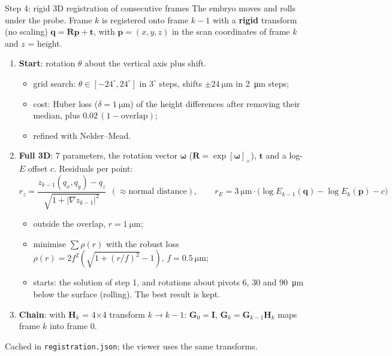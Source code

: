 \documentclass[aspectratio=169,9pt]{beamer}
\begin{document}
\begin{frame}{Step 4: rigid 3D registration of consecutive frames}
\small
The embryo moves and rolls under the probe. Frame $k$ is registered onto frame $k-1$ with a \textbf{rigid} transform (no scaling) $\mathbf q=\mathbf R\mathbf p+\mathbf t$, with $\mathbf p=(x,y,z)$ in the scan coordinates of frame $k$ and $z$ = height.
\begin{enumerate}
\item \textbf{Start}: rotation $\theta$ about the vertical axis plus shift.
 \begin{itemize}
 \item grid search: $\theta\in[-24^\circ,24^\circ]$ in $3^\circ$ steps, shifts $\pm\SI{24}{\micro\metre}$ in \SI{2}{\micro\metre} steps;
 \item cost: Huber loss ($\delta=\SI{1}{\micro\metre}$) of the height differences after removing their median, plus $0.02\,(1-\text{overlap})$;
 \item refined with Nelder--Mead.
 \end{itemize}
\item \textbf{Full 3D}: 7 parameters, the rotation vector $\bm\omega$ ($\mathbf R=\exp[\bm\omega]_\times$), $\mathbf t$ and a log-$E$ offset $c$. Residuals per point:
\[r_z=\frac{z_{k-1}(q_x,q_y)-q_z}{\sqrt{1+|\nabla z_{k-1}|^2}}\ \ (\approx\text{normal distance}),\qquad r_E=\SI{3}{\micro\metre}\cdot\bigl(\log E_{k-1}(\mathbf q)-\log E_k(\mathbf p)-c\bigr)\]
 \begin{itemize}
 \item outside the overlap, $r=\SI{1}{\micro\metre}$;
 \item minimise $\sum\rho(r)$ with the robust loss $\rho(r)=2f^2(\sqrt{1+(r/f)^2}-1)$, $f=\SI{0.5}{\micro\metre}$;
 \item starts: the solution of step 1, and rotations about pivots \SI{6}{}, \SI{30}{} and \SI{90}{\micro\metre} below the surface (rolling). The best result is kept.
 \end{itemize}
\item \textbf{Chain}: with $\mathbf H_k$ = 4$\times$4 transform $k\to k-1$: $\mathbf G_0=\mathbf I$, $\mathbf G_k=\mathbf G_{k-1}\mathbf H_k$ maps frame $k$ into frame 0.
\end{enumerate}
Cached in \texttt{registration.json}; the viewer uses the same transforms.
\end{frame}
\end{document}
